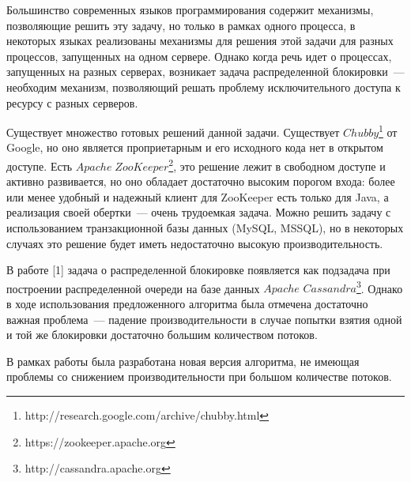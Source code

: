 Большинство современных языков программирования содержит механизмы, позволяющие решить эту задачу, но только в рамках одного процесса, в некоторых языках реализованы механизмы для решения этой задачи для разных процессов, запущенных на одном сервере. Однако когда речь идет о процессах, запущенных на разных серверах, возникает задача распределенной блокировки~--- необходим механизм, позволяющий решать проблему исключительного доступа к ресурсу с разных серверов.

Существует множество готовых решений данной задачи. Существует $Chubby$\footnote{http://research.google.com/archive/chubby.html} от Google, но оно является проприетарным и его исходного кода нет в открытом доступе. Есть $Apache\;ZooKeeper$\footnote{https://zookeeper.apache.org}, это решение лежит в свободном доступе и активно развивается, но оно обладает достаточно высоким порогом входа: более или менее удобный и надежный клиент для ZooKeeper есть только для Java, а реализация своей обертки~--- очень трудоемкая задача. Можно решить задачу с использованием транзакционной базы данных (MySQL, MSSQL), но в некоторых случаях это решение будет иметь недостаточно высокую производительность.

В работе [1] задача о распределенной блокировке появляется как подзадача при построении распределенной очереди на базе данных $Apache$ $Cassandra$\footnote{http://cassandra.apache.org}. Однако в ходе использования предложенного алгоритма была отмечена достаточно важная проблема~--- падение производительности в случае попытки взятия одной и той же блокировки достаточно большим количеством потоков.

В рамках работы была разработана новая версия алгоритма, не имеющая проблемы со снижением производительности при большом количестве потоков.
